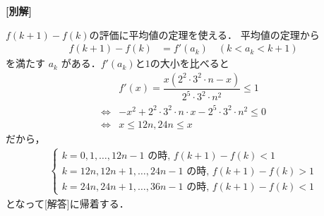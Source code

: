 \documentclass[../../main.tex]{subfiles}
\begin{document}
{\bf [別解]}

$f(k+1)-f(k)$の評価に平均値の定理を使える．
平均値の定理から
\begin{align}
  f(k+1) - f(k) &= f'(a_k) \quad (k < a_k < k+1) \label{eq:5}
\end{align}
を満たす $a_k$ がある．$f'(a_k)$と$1$の大小を比べると
\begin{align}
  & f'(x) = \dfrac{x(2^2 \cdot 3^2 \cdot n - x)}{2^5 \cdot 3^2 \cdot n^2} \le 1 \\
  \iff
  & -x^2 + 2^2 \cdot 3^2 \cdot n \cdot x - 2^5 \cdot 3^2 \cdot n^2 \le 0 \\
  \iff
  & x \le 12n, 24n \le x
\end{align}
だから，
\begin{align}
  \begin{cases}
    k = 0, 1, \dots, 12n-1 \text{ の時, } f(k+1) - f(k) < 1 \\
    k = 12n, 12n+1, \dots, 24n-1 \text{ の時, } f(k+1) - f(k) > 1 \\
    k = 24n, 24n+1, \dots, 36n-1 \text{ の時, } f(k+1) - f(k) < 1
  \end{cases}
\end{align}
となって[解答]に帰着する．

\newpage
\end{document}
